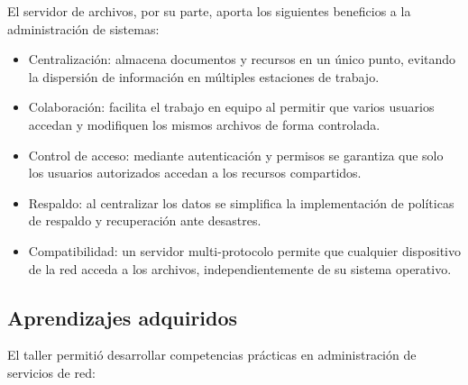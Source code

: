 El servidor de archivos, por su parte, aporta los siguientes beneficios a la
administración de sistemas:

\begin{itemize}
  \item Centralización: almacena documentos y recursos en un único
        punto, evitando la dispersión de información en múltiples estaciones
        de trabajo.
  \item Colaboración: facilita el trabajo en equipo al permitir que
        varios usuarios accedan y modifiquen los mismos archivos de forma
        controlada.
  \item Control de acceso: mediante autenticación y permisos se
        garantiza que solo los usuarios autorizados accedan a los recursos
        compartidos.
  \item Respaldo: al centralizar los datos se simplifica la
        implementación de políticas de respaldo y recuperación ante
        desastres.
  \item Compatibilidad: un servidor multi-protocolo permite que
        cualquier dispositivo de la red acceda a los archivos,
        independientemente de su sistema operativo.
\end{itemize}

\subsection{Aprendizajes adquiridos}

El taller permitió desarrollar competencias prácticas en administración de
servicios de red:

